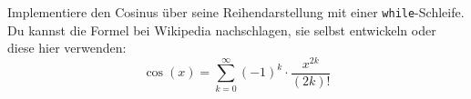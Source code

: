 \begin{aufg}
    Implementiere den Cosinus über seine Reihendarstellung mit einer \texttt{while}-Schleife. Du kannst die Formel bei Wikipedia nachschlagen, sie selbst entwickeln oder diese hier verwenden:
\[ \cos(x) = \sum_{k = 0}^{\infty}{(-1)^k \cdot \frac{x^{2k}}{(2k)!}} \]
\end{aufg}
